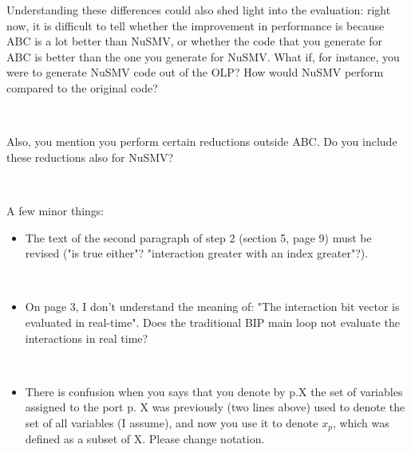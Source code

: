 Understanding these differences could also shed light into the evaluation:
right now, it is difficult to tell whether the improvement in performance is
because ABC is a lot better than NuSMV, or whether the code that you generate
for ABC is better than the one you generate for NuSMV. What if, for instance,
you were to generate NuSMV code out of the OLP? How would NuSMV perform
compared to the original code? 


~



Also, you mention you perform certain
reductions outside ABC. Do you include these reductions also for NuSMV?

~


A few minor things:

\begin{itemize}
\item The text of the second paragraph of step 2 (section 5, page 9) must be
revised ("is true either"? "interaction greater with an index greater"?).

~

\done
{}

\item On page 3, I don't understand the meaning of: "The interaction bit vector is
evaluated in real-time". Does the traditional BIP main loop not evaluate the
interactions in real time?

~

\done
{}

\item There is confusion when you says that you denote by p.X the set of variables
assigned to the port p. X was previously (two lines above) used to denote
the set of all variables (I assume), and now you use it to denote $x_p$, which
was defined as a subset of X. Please change notation.

~

\done
\end{itemize}
